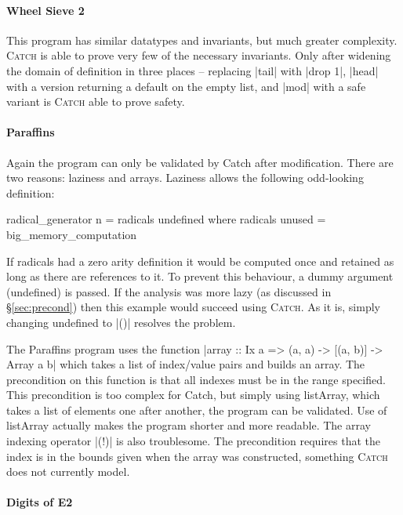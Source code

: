 \documentclass[preprint]{sigplanconf}
\newcommand{\C}[1]{\textsf{#1}}
\newcommand{\catch}{\textsc{Catch}}
\begin{document}
\paragraph{Wheel Sieve 2}

This program has similar datatypes and invariants, but much greater complexity. \catch{} is able to prove very few of the necessary invariants. Only after widening the domain of definition in three places -- replacing |tail| with |drop 1|, |head| with a version returning a default on the empty list, and |mod| with a safe variant is \catch{} able to prove safety.


\paragraph{Paraffins}

Again the program can only be validated by Catch after modification. There are two reasons: laziness and arrays. Laziness allows the following odd-looking definition:

\begin{code}
radical_generator n = radicals undefined
  where radicals unused = big_memory_computation
\end{code}

If \C{radicals} had a zero arity definition it would be computed once and retained as long as there are references to it. To prevent this behaviour, a dummy argument (\C{undefined}) is passed. If the analysis was more lazy (as discussed in \S\ref{sec:precond}) then this example would succeed using \catch{}. As it is, simply changing \C{undefined} to |()| resolves the problem.

The Paraffins program uses the function |array :: Ix a => (a, a) -> [(a, b)] -> Array a b| which takes a list of index/value pairs and builds an array. The precondition on this function is that all indexes must be in the range specified. This precondition is too complex for Catch, but simply using \C{listArray}, which takes a list of elements one after another, the program can be validated. Use of \C{listArray} actually makes the program shorter and more readable. The array indexing operator |(!)| is also troublesome. The precondition requires that the index is in the bounds given when the array was constructed, something \catch{} does not currently model.


\paragraph{Digits of E2}
\end{document}
